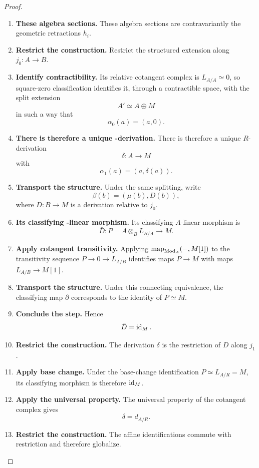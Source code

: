 \begin{proof}
\begin{enumerate}[label=\textup{(\arabic*)}]
    \item \textbf{These algebra sections.}
    These algebra sections are contravariantly the geometric retractions \(h_i\).

    \item \textbf{Restrict the construction.}
    Restrict the structured extension along \(j_0:A\to B\).

    \item \textbf{Identify contractibility.}
    Its relative cotangent complex is \(L_{A/A}\simeq0\), so square-zero classification identifies it,
    through a contractible space, with the split extension
    \[
            A'\simeq A\oplus M
        \]
    in such a way that
    \[
            \alpha_0(a)=(a,0).
        \]

    \item \textbf{There is therefore a unique -derivation.}
    There is therefore a unique \(R\)-derivation
    \[
            \delta:A\longrightarrow M
        \]
    with
    \[
            \alpha_1(a)=(a,\delta(a)).
        \]

    \item \textbf{Transport the structure.}
    Under the same splitting, write
    \[
            \beta(b)=(\mu(b),D(b)),
        \]
    where \(D:B\to M\) is a derivation relative to \(j_0\).

    \item \textbf{Its classifying -linear morphism.}
    Its classifying \(A\)-linear morphism is
    \[
            \bar D:P=A\otimes_BL_{B/A}\longrightarrow M.
        \]

    \item \textbf{Apply cotangent transitivity.}
    Applying \(\operatorname{map}_{\operatorname{Mod}_A}(-,M[1])\) to the transitivity sequence \(P\to0\to L_{A/B}\) identifies maps \(P\to M\)
    with maps \(L_{A/B}\to M[1]\).

    \item \textbf{Transport the structure.}
    Under this connecting equivalence, the classifying map \(\partial\) corresponds to the
    identity of \(P\simeq M\).

    \item \textbf{Conclude the step.}
    Hence
    \[
            \bar D=\operatorname{id}_M.
        \]

    \item \textbf{Restrict the construction.}
    The derivation \(\delta\) is the restriction of \(D\) along \(j_1\).

    \item \textbf{Apply base change.}
    Under the base-change identification \(P\simeq L_{A/R}=M\), its classifying morphism is therefore
    \(\operatorname{id}_M\).

    \item \textbf{Apply the universal property.}
    The universal property of the cotangent complex gives
    \[
            \delta=d_{A/R}.
        \]

    \item \textbf{Restrict the construction.}
    The affine identifications commute with restriction and therefore globalize.
\end{enumerate}
\end{proof}

